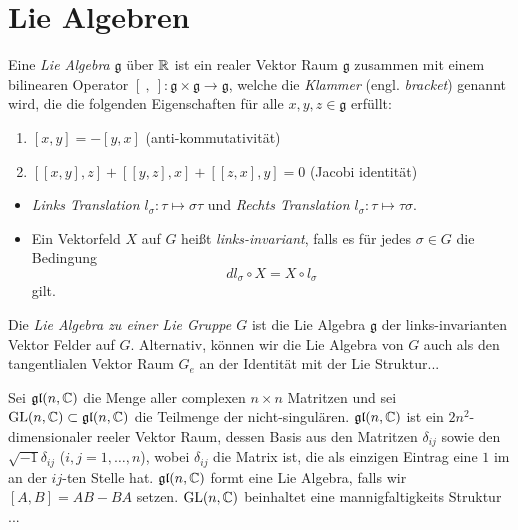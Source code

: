 \section{Lie Algebren}
\begin{defn}
Eine \emph{Lie Algebra} $\mathfrak g$ über $\mathbb{R}$ ist ein realer Vektor Raum
$\mathfrak g$ zusammen mit einem bilinearen Operator 
$[~,~]: \mathfrak g\times\mathfrak g\to\mathfrak g$, welche die \emph{Klammer}
(engl.  \emph{bracket}) genannt wird, die die folgenden Eigenschaften für alle
$x,y,z\in \mathfrak g$ erfüllt:
\begin{enumerate}
\item $[x,y]=-[y,x]$                    \hfill (anti-kommutativität)
\item $[[x,y],z]+[[y,z],x]+[[z,x],y]=0$ \hfill (Jacobi identität)
\end{enumerate}
\end{defn}
\begin{defn} 
\begin{itemize}
\item 
\emph{Links Translation $l_\sigma:\tau \mapsto \sigma\tau$}
und 
\emph{Rechts Translation $l_\sigma:\tau \mapsto \tau\sigma$}.
\item 
Ein Vektorfeld $X$ auf $G$ heißt \emph{links-invariant}, falls es für jedes
$\sigma\in G$ die Bedingung
\[
dl_\sigma \circ X = X\circ l_\sigma
\]
 gilt.
\end{itemize}
\end{defn}
\begin{defn} 
Die \emph{Lie Algebra zu einer Lie Gruppe $G$} ist die Lie Algebra $\mathfrak
g$ der links-invarianten Vektor Felder auf $G$. Alternativ,
können wir die Lie Algebra von $G$ auch als den tangentlialen Vektor Raum $G_e$
an der Identität mit der Lie Struktur...
\end{defn}
\begin{exmp}
Sei $\mathfrak{gl}(n,\mathbb{C})$ die Menge aller complexen $n\times n$ Matritzen und
sei $\operatorname{GL}(n,\mathbb{C})\subset\mathfrak{gl}(n,\mathbb{C})$ die Teilmenge der nicht-singulären.
$\mathfrak{gl}(n,\mathbb{C})$ ist ein $2n^2$-dimensionaler reeler Vektor Raum, dessen
Basis aus den Matritzen $\delta_{ij}$ sowie den $\sqrt{-1}\delta_{ij}$
($i,j=1,\dots,n$), wobei $\delta_{ij}$ die Matrix ist, die als einzigen Eintrag
eine $1$ im an der $ij$-ten Stelle hat.
$\mathfrak{gl}(n,\mathbb{C})$ formt eine Lie Algebra, falls wir $[A,B]=AB-BA$ setzen.
$\operatorname{GL}(n,\mathbb{C})$ beinhaltet eine mannigfaltigkeits Struktur ...
\end{exmp}

